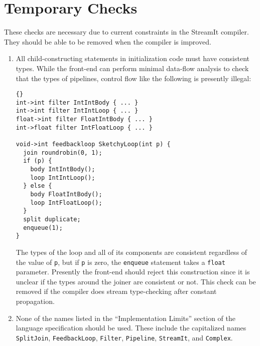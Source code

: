 \documentclass[11pt]{article}
\begin{document}
\section{Temporary Checks}

These checks are necessary due to current constraints in the StreamIt
compiler.  They should be able to be removed when the compiler is
improved.

\begin{enumerate}
\item All child-constructing statements in initialization code must
  have consistent types.  While the front-end can perform minimal
  data-flow analysis to check that the types of pipelines, control
  flow like the following is presently illegal:

\begin{lstlisting}{}
int->int filter IntIntBody { ... }
int->int filter IntIntLoop { ... }
float->int filter FloatIntBody { ... }
int->float filter IntFloatLoop { ... }

void->int feedbackloop SketchyLoop(int p) {
  join roundrobin(0, 1);
  if (p) {
    body IntIntBody();
    loop IntIntLoop();
  } else {
    body FloatIntBody();
    loop IntFloatLoop();
  }
  split duplicate;
  enqueue(1);
}
\end{lstlisting}

  The types of the loop and all of its components are consistent
  regardless of the value of \lstinline|p|, but if \lstinline|p| is
  zero, the \lstinline|enqueue| statement takes a \lstinline|float|
  parameter.  Presently the front-end should reject this construction
  since it is unclear if the types around the joiner are consistent or
  not.  This check can be removed if the compiler does stream
  type-checking after constant propagation.
\item None of the names listed in the ``Implementation Limits''
  section of the language specification should be used.  These include
  the capitalized names \lstinline|SplitJoin|,
  \lstinline|FeedbackLoop|, \lstinline|Filter|, \lstinline|Pipeline|,
  \lstinline|StreamIt|, and \lstinline|Complex|.
\end{enumerate}
\end{document}
